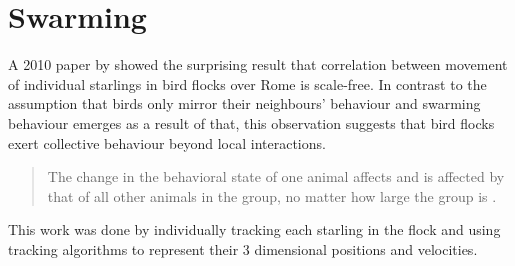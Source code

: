 \section{Swarming}
A 2010 paper by \citeauthor{2010-starlings} showed the surprising result that correlation between movement of individual starlings in bird flocks over Rome is scale-free.
In contrast to the assumption that birds only mirror their neighbours' behaviour and swarming behaviour emerges as a result of that, this observation suggests that bird flocks exert collective behaviour beyond local interactions.
\begin{quote}
  The change in the behavioral state of one animal affects and is affected by that of all other animals in the group, no matter how large the group is
  \parencite{2010-starlings}.
\end{quote}
This work was done by individually tracking each starling in the flock and using tracking algorithms to represent their 3 dimensional positions and velocities.
